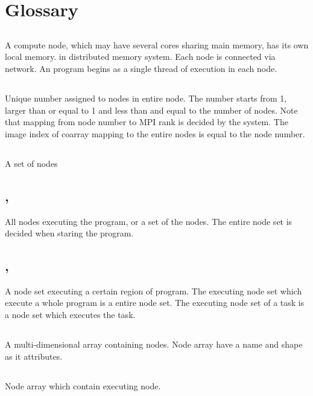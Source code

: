 
\section{Glossary}
\subsection*{}
A compute node,
which may have several cores sharing main memory, has its own local
memory. in distributed memory system. Each node is connected via
network. An \XMP program begins as a single thread of execution
in each node.

\subsection*{}
Unique number assigned to nodes in entire
node. The number starts from 1, larger than or equal to 1 and less
than and equal to the number of nodes. Note that mapping from node
number to MPI rank is decided by the system. The image index of
coarray mapping to the entire nodes is equal to the node number. 

\subsection*{}
A set of nodes

\subsection*{, }
All nodes
executing the program, or a set of the nodes. The entire node set is
decided when staring the program.

\subsection*{, }
A node set executing a certain region of program. The executing node
set which execute a whole program is a entire node set. The executing
node set of a task is a node set which executes the task. 

\subsection*{}
A multi-dimensional array containing nodes. Node array have a
name and shape as it attributes.

\subsection*{}
Node array which contain executing node.

